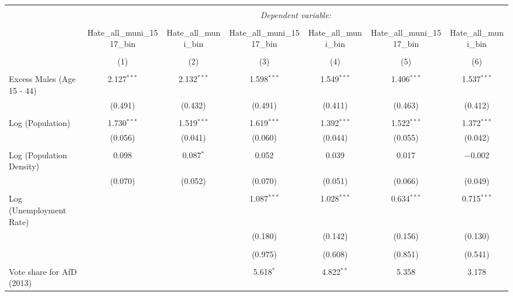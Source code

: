 
\begin{table}[!htbp] \centering 
  \caption{} 
  \label{} 
\begin{tabular}{@{\extracolsep{5pt}}lcccccc} 
\\[-1.8ex]\hline 
\hline \\[-1.8ex] 
 & \multicolumn{6}{c}{\textit{Dependent variable:}} \\ 
\cline{2-7} 
\\[-1.8ex] & Hate\_all\_muni\_1517\_bin & Hate\_all\_muni\_bin & Hate\_all\_muni\_1517\_bin & Hate\_all\_muni\_bin & Hate\_all\_muni\_1517\_bin & Hate\_all\_muni\_bin \\ 
\\[-1.8ex] & (1) & (2) & (3) & (4) & (5) & (6)\\ 
\hline \\[-1.8ex] 
 Excess Males (Age 15 - 44) & 2.127$^{***}$ & 2.132$^{***}$ & 1.598$^{***}$ & 1.549$^{***}$ & 1.406$^{***}$ & 1.537$^{***}$ \\ 
  & (0.491) & (0.432) & (0.491) & (0.411) & (0.463) & (0.412) \\ 
  & & & & & & \\ 
 Log (Population) & 1.730$^{***}$ & 1.519$^{***}$ & 1.619$^{***}$ & 1.392$^{***}$ & 1.522$^{***}$ & 1.372$^{***}$ \\ 
  & (0.056) & (0.041) & (0.060) & (0.044) & (0.055) & (0.042) \\ 
  & & & & & & \\ 
 Log (Population Density) & 0.098 & 0.087$^{*}$ & 0.052 & 0.039 & 0.017 & $-$0.002 \\ 
  & (0.070) & (0.052) & (0.070) & (0.051) & (0.066) & (0.049) \\ 
  & & & & & & \\ 
 Log (Unemployment Rate) &  &  & 1.087$^{***}$ & 1.028$^{***}$ & 0.634$^{***}$ & 0.715$^{***}$ \\ 
  &  &  & (0.180) & (0.142) & (0.156) & (0.130) \\ 
  & & & & & & \\ 
  &  &  & (0.975) & (0.608) & (0.851) & (0.541) \\ 
  & & & & & & \\ 
 Vote share for AfD (2013) &  &  & 5.618$^{*}$ & 4.822$^{**}$ & 5.358 & 3.178 \\ 

\end{tabular}
\end{table}
